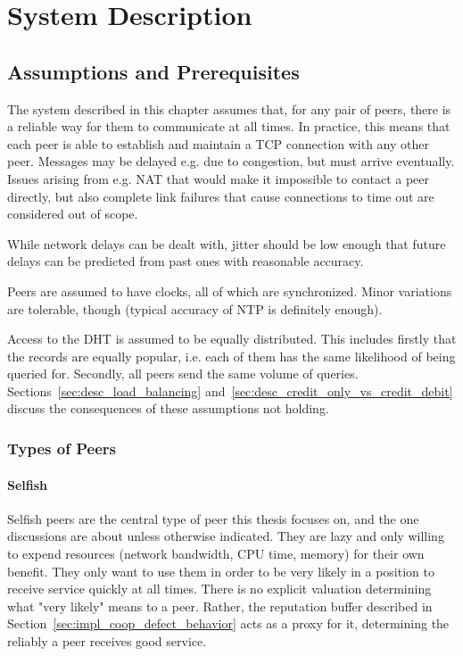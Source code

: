 \chapter{System Description}
\label{chap:system_description}
\section{Assumptions and Prerequisites}
The system described in this chapter assumes that, for any pair of peers, there
is a reliable way for them to communicate at all times. In practice, this means
that each peer is able to establish and maintain a TCP connection with any other
peer. Messages may be delayed e.g. due to congestion, but must arrive
eventually. Issues arising from e.g. NAT that would make it impossible to
contact a peer directly, but also complete link failures that cause connections
to time out are considered out of scope.

While network delays can be dealt with, jitter should be low enough that future
delays can be predicted from past ones with reasonable accuracy.

Peers are assumed to have clocks, all of which are synchronized. Minor
variations are tolerable, though (typical accuracy of NTP is definitely enough).

Access to the DHT is assumed to be equally distributed. This includes firstly
that the records are equally popular, i.e. each of them has the same likelihood
of being queried for. Secondly, all peers send the same volume of queries.
Sections~\ref{sec:desc_load_balancing}
and~\ref{sec:desc_credit_only_vs_credit_debit} discuss the consequences of these
assumptions not holding.

\subsection{Types of Peers}
\subsubsection{Selfish}
Selfish peers are the central type of peer this thesis focuses on, and the one
discussions are about unless otherwise indicated. They are lazy and only willing
to expend resources (network bandwidth, CPU time, memory) for their own benefit.
They only want to use them in order to be very likely in a position to receive
service quickly at all times. There is no explicit valuation determining what
"very likely" means to a peer. Rather, the reputation buffer described in
Section~\ref{sec:impl_coop_defect_behavior} acts as a proxy for it, determining
the reliably a peer receives good service.

